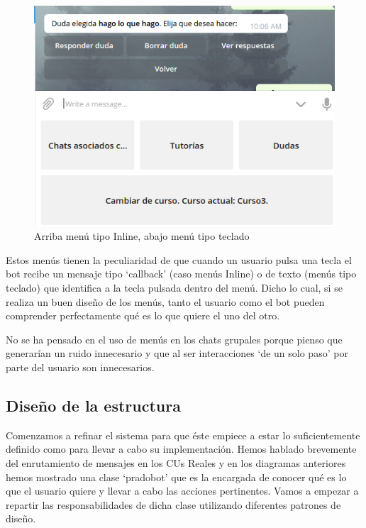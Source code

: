 \begin{figure}[H] %
\centering
\includegraphics[scale=0.7]{imagenes/random/Screenshot_2017-08-21_13-09-40.png}  %

\caption{Arriba menú tipo Inline, abajo menú tipo teclado}\label{figura10}
\end{figure}
Estos menús tienen la peculiaridad de que cuando un usuario pulsa una tecla  el bot recibe un mensaje tipo \enquote*{callback} (caso menús Inline) o de texto (menús tipo teclado) que identifica a la tecla pulsada dentro del menú.  Dicho lo cual, si se realiza un buen diseño de los menús, tanto el usuario como el bot pueden comprender perfectamente qué es lo que quiere el uno del otro.
\par
No se ha pensado en el uso de menús en los chats grupales porque pienso que generarían un ruido innecesario y que al ser interacciones \enquote*{de un solo paso} por parte del usuario son innecesarios.

\subsection{Diseño de la estructura}

Comenzamos a refinar el sistema para que éste empiece a estar lo suficientemente definido como para llevar a cabo su implementación. Hemos hablado brevemente del enrutamiento de mensajes en los CUs Reales y  en los diagramas anteriores hemos mostrado una clase \enquote*{pradobot} que es la encargada de conocer qué es lo que el usuario quiere y llevar a cabo las acciones pertinentes. Vamos a empezar a repartir las responsabilidades de dicha clase utilizando diferentes patrones de diseño. 
